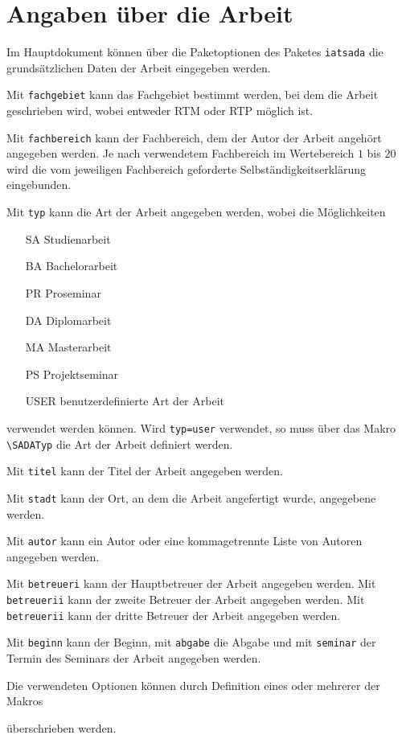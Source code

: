 \section{Angaben über die Arbeit}
Im Hauptdokument können über die Paketoptionen des Paketes \texttt{iatsada} die grundsätzlichen Daten der Arbeit eingegeben werden.

Mit \texttt{fachgebiet} kann das Fachgebiet bestimmt werden, bei dem die Arbeit geschrieben wird, wobei entweder RTM oder RTP möglich ist.

Mit \texttt{fachbereich} kann der Fachbereich, dem der Autor der Arbeit angehört angegeben werden.
Je nach verwendetem Fachbereich im Wertebereich $1$ bis $20$ wird die vom jeweiligen Fachbereich geforderte Selbständigkeitserklärung eingebunden.

Mit \texttt{typ} kann die Art der Arbeit angegeben werden, wobei die Möglichkeiten
\begin{itemize}
	\item[SA] Studienarbeit
	\item[BA] Bachelorarbeit
	\item[PR] Proseminar
	\item[DA] Diplomarbeit
	\item[MA] Masterarbeit
	\item[PS] Projektseminar
	\item[USER] benutzerdefinierte Art der Arbeit
\end{itemize}
verwendet werden können.
Wird \texttt{typ=user} verwendet, so muss über das Makro \verb|\SADATyp| die Art der Arbeit definiert werden.

Mit \texttt{titel} kann der Titel der Arbeit angegeben werden.

Mit \texttt{stadt} kann der Ort, an dem die Arbeit angefertigt wurde, angegebene werden.

Mit \texttt{autor} kann ein Autor oder eine kommagetrennte Liste von Autoren angegeben werden.

Mit \texttt{betreueri} kann der Hauptbetreuer der Arbeit angegeben werden.
Mit \texttt{betreuerii} kann der zweite Betreuer der Arbeit angegeben werden.
Mit \texttt{betreuerii} kann der dritte Betreuer der Arbeit angegeben werden.

Mit \texttt{beginn} kann der Beginn, mit \texttt{abgabe} die Abgabe und mit \texttt{seminar} der Termin des Seminars der Arbeit angegeben werden.

Die verwendeten Optionen können durch Definition eines oder mehrerer der Makros
\begin{verbatimtab}
	\newcommand{\SADATyp}{Diplomarbeit}
	\newcommand{\SADATitel}{Eine \LaTeX-Vorlage für schriftliche (Abschluss-)Arbeiten am IAT}
	\newcommand{\SADAStadt}{Darmstadt}
	\newcommand{\SADAAutor}{Martin Mustermann, Erika Musterfrau, John Doe}
	\newcommand{\SADABetreuerI}{Dipl.-Ing. Rudi Ratlos}
	\newcommand{\SADABetreuerII}{Dipl.-Ing. Hans Hilflos}
	\newcommand{\SADABetreuerIII}{}
	\newcommand{\SADABegin}{01. Oktober 2016}
	\newcommand{\SADAAbgabe}{01. April 2017}
	\newcommand{\SADASeminar}{01. Mai 2017}
\end{verbatimtab}
überschrieben werden.


